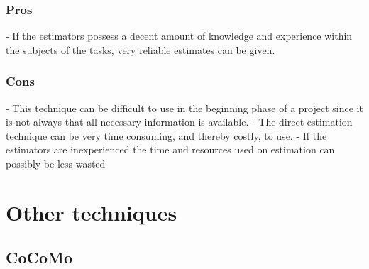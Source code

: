 \subsubsection{Pros}
- If the estimators possess a decent amount of knowledge and experience within the subjects of the tasks, very reliable estimates can be given. 

\subsubsection{Cons}
- This technique can be difficult to use in the beginning phase of a project since it is not always that all necessary information is available.
- The direct estimation technique can be very time consuming, and thereby costly, to use.
- If the estimators are inexperienced the time and resources used on estimation can possibly be less wasted

\section{Other techniques}
\subsection{CoCoMo}



















